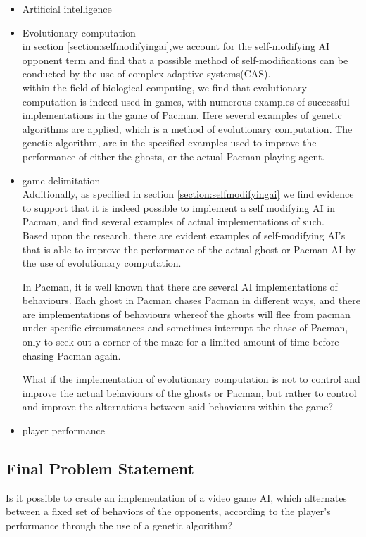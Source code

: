 \begin{itemize}
\item Artificial intelligence\\
\item Evolutionary computation\\
in section \ref{section:selfmodifyingai},we account for the self-modifying AI opponent term and find that a possible method of self-modifications can be conducted by the use of complex adaptive systems(CAS).\\

within the field of biological computing, we find that evolutionary computation is indeed used in games, with numerous examples of successful implementations in the game of Pacman. Here several examples of genetic algorithms are applied, which is a method of evolutionary computation. The genetic algorithm, are in the specified examples used to improve the performance of either the ghosts, or the actual Pacman playing agent.
\item game delimitation\\
Additionally, as specified in section \ref{section:selfmodifyingai} we find evidence to support that it is indeed possible to implement a self modifying AI in Pacman, and find several examples of actual implementations of such.\\

Based upon the research, there are evident examples of self-modifying AI's that is able to improve the performance of the actual ghost or Pacman AI by the use of evolutionary computation. 

In Pacman, it is well known that there are several AI implementations of behaviours. Each ghost in Pacman chases Pacman in different ways, and there are implementations of behaviours whereof the ghosts will flee from pacman under specific circumstances and sometimes interrupt the chase of Pacman, only to seek out a corner of the maze for a limited amount of time before chasing Pacman again.

What if the implementation of evolutionary computation is not to control  and improve the actual behaviours of the ghosts or Pacman, but rather to control and improve the alternations between said behaviours within the game?

\item player performance\\
\end{itemize}


\subsection{Final Problem Statement} \label{sec:finalproblemstatement}
Is it possible to create an implementation of a video game AI, which alternates between a fixed set of behaviors of the opponents, according to the player's performance through the use of a genetic algorithm?
